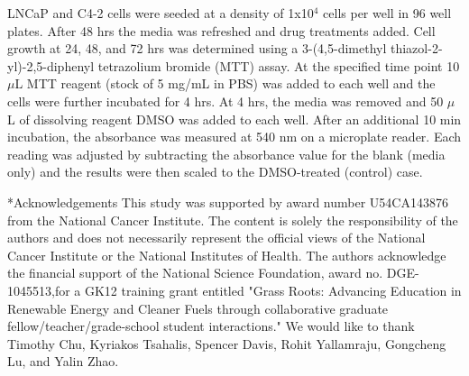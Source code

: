 \documentclass[12pt]{article}
\makeatletter
\renewcommand\section{\@startsection
	{subsection}{2}{0mm}
	{-0.2in}
	{0.05\baselineskip}
	{\normalfont\large\bfseries}}
\makeatother
\begin{document}
LNCaP and C4-2 cells were seeded at a density of 1x10$^{4}$ cells per well in 96 well plates. After 48 hrs the media was refreshed and drug treatments added. Cell growth at 24, 48, and 72 hrs was determined using a 3-(4,5-dimethyl thiazol-2-yl)-2,5-diphenyl tetrazolium bromide (MTT) assay. At the specified time point 10 $\mu$L MTT reagent (stock of 5 mg/mL in PBS) was added to each well and the cells were further incubated for 4 hrs. At 4 hrs, the media was removed and 50 $\mu$L of dissolving reagent DMSO was added to each well. After an additional 10 min incubation, the absorbance was measured at 540 nm on a microplate reader. Each reading was adjusted by subtracting the absorbance value for the blank (media only) and the results were then scaled to the DMSO-treated (control) case. 


\section*{Acknowledgements}
This study was supported by award number U54CA143876 from the National Cancer Institute.
The content is solely the responsibility of the authors and does not necessarily represent the official views of the National Cancer Institute or the National Institutes of Health.
The authors acknowledge the financial support of the National Science Foundation, award no. DGE-1045513,for a GK12 training grant entitled "Grass Roots: Advancing Education in Renewable Energy and Cleaner Fuels through collaborative graduate fellow/teacher/grade-school student interactions."
We would like to thank Timothy Chu, Kyriakos Tsahalis, Spencer Davis, Rohit Yallamraju, Gongcheng Lu, and Yalin Zhao. 

\clearpage
%
%




\clearpage
\end{document}
